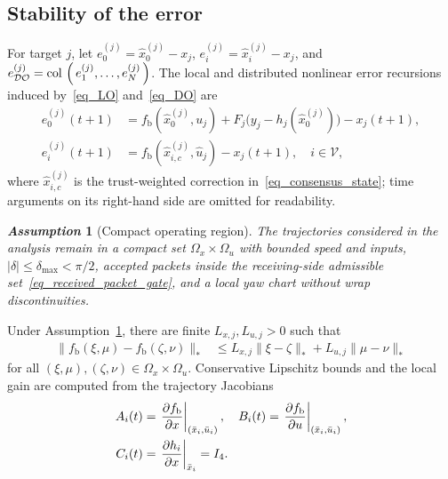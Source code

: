 \documentclass[letterpaper,journal]{IEEEtran}
\def\col#1{\mathop{{\rm col}\,\left(\,#1\,\right)}}
\def\V{\mathcal{V}} %
\def\DO{\mathcal{DO}} %
\newtheorem{assumption}{\it Assumption}%
\begin{document}
\subsection{Stability of the error}\label{subsec_Prove}
For target $j$, let $e_0^{(j)}=\hat x_0^{(j)}-x_j$, $e_i^{(j)}=\hat x_i^{(j)}-x_j$, and $e_{\DO}^{(j)}=\col{e_1^{(j)},\ldots,e_N^{(j)}}$. The local and distributed nonlinear error recursions induced by~\eqref{eq_LO} and~\eqref{eq_DO} are
\begin{align}
e_0^{(j)}(t+1)
&=f_{\mathrm b}(\hat x_0^{(j)},u_j)
+F_j\big(y_j-h_j(\hat x_0^{(j)})\big)-x_j(t+1),
\label{eq_raw_e0}\\
e_i^{(j)}(t+1)
&=f_{\mathrm b}(\hat x_{i,c}^{(j)},\hat u_j)-x_j(t+1),\quad i\in\V,
\label{eq_raw_eDO}
\end{align}
where $\hat x_{i,c}^{(j)}$ is the trust-weighted correction in~\eqref{eq_consensus_state}; time arguments on its right-hand side are omitted for readability.
\begin{assumption}[Compact operating region]\label{ass_compact_region}
The trajectories considered in the analysis remain in a compact set $\Omega_x\times\Omega_u$ with bounded speed and inputs, $|\delta|\le\delta_{\max}<\pi/2$, accepted packets inside the receiving-side admissible set~\eqref{eq_received_packet_gate}, and a local yaw chart without wrap discontinuities.
\end{assumption}
Under Assumption~\ref{ass_compact_region}, there are finite $L_{x,j},L_{u,j}>0$ such that
\begin{equation}
\begin{aligned}
\|f_{\mathrm b}(\xi,\mu)-f_{\mathrm b}(\zeta,\nu)\|_*
&\le L_{x,j}\|\xi-\zeta\|_*
+L_{u,j}\|\mu-\nu\|_*
\end{aligned}
\label{eq_nonlinear_lipschitz}
\end{equation}
for all $(\xi,\mu),(\zeta,\nu)\in\Omega_x\times\Omega_u$. Conservative Lipschitz bounds and the local gain are computed from the trajectory Jacobians
\begin{align}
 A_i(t)&=\left.\frac{\partial f_{\mathrm b}}{\partial x}\right|_{(\bar x_i,\bar u_i)},\quad
 B_i(t)=\left.\frac{\partial f_{\mathrm b}}{\partial u}\right|_{(\bar x_i,\bar u_i)},\notag\\
 C_i(t)&=\left.\frac{\partial h_i}{\partial x}\right|_{\bar x_i}=I_4.
 \label{eq_bicycle_jacobian}
\end{align}
\end{document}
